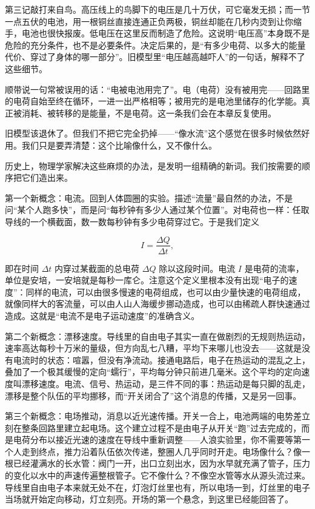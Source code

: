第三记敲打来自鸟。高压线上的鸟脚下的电压是几十万伏，可它毫发无损；而一节一点五伏的电池，用一根铜丝直接连通正负两极，铜丝却能在几秒内烫到让你缩手，电池也很快报废。低电压在这里反而制造了危险。这说明“电压高”本身既不是危险的充分条件，也不是必要条件。决定后果的，是“有多少电荷、以多大的能量代价、穿过了身体的哪一部分”。旧模型里“电压越高越吓人”的一句话，解释不了这些细节。

顺带说一句常被误用的话：“电被电池用完了”。电（电荷）没有被用完——回路里的电荷自始至终在循环，一进一出严格相等；被用完的是电池里储存的化学能。真正被消耗、被转移的是能量，不是电荷。这一条我们会在本章反复使用。

旧模型该退休了。但我们不把它完全扔掉——“像水流”这个感觉在很多时候依然好用。我们只是要弄清楚：这个比喻像什么，又不像什么。


历史上，物理学家解决这些麻烦的办法，是发明一组精确的新词。我们按需要的顺序把它们造出来。

第一个新概念：电流。回到人体圆圈的实验。描述“流量”最自然的办法，不是问“某个人跑多快”，而是问“每秒钟有多少人通过某个位置”。对电荷也一样：任取导线的一个横截面，数一数每秒钟有多少电荷穿过它。于是我们定义

\[
I=\frac{\Delta Q}{\Delta t},
\]

即在时间 \(\Delta t\) 内穿过某截面的总电荷 \(\Delta Q\) 除以这段时间。电流 \(I\) 是电荷的流率，单位是安培，一安培就是每秒一库仑。注意这个定义里根本没有出现“电子的速度”：同样的电流，可以由很多慢速的电荷组成，也可以由少量快速的电荷组成，就像同样大的客流量，可以由人山人海缓步挪动造成，也可以由稀疏人群快速通过造成。这就是“电流不是电子运动速度”的准确含义。

第二个新概念：漂移速度。导线里的自由电子其实一直在做剧烈的无规则热运动，速率高达每秒十万米的量级，但方向乱七八糟，平均下来哪儿也没去——这就是没有电流时的状态：喧嚣，但没有净流动。接通电路后，电子在热运动的混乱之上，叠加了一个极其缓慢的定向“蠕行”，平均每分钟只前进几毫米。这个平均的定向速度叫漂移速度。电流、信号、热运动，是三件不同的事：热运动是每只脚的乱走，漂移是整个队伍的平均挪移，而“开关闭合了”这个消息的传播，又是另一回事。

第三个新概念：电场推动，消息以近光速传播。开关一合上，电池两端的电势差立刻在整条回路里建立起电场。这个建立过程不是由电子从开关“跑”过去完成的，而是电荷分布以接近光速的速度在导线中重新调整——人浪实验里，你不需要等第一个人走到终点，推力沿着队伍依次传递，整圈人几乎同时开走。电场像什么？像一根已经灌满水的长水管：阀门一开，出口立刻出水，因为水早就充满了管子，压力的变化以水中的声速传遍整根管子。它不像什么？不像空水管等水从源头流过来。导线里自由电子本来就无处不在，灯泡灯丝里也有，所以电场一到，灯丝里的电子当场就开始定向移动，灯立刻亮。开场的第一个悬念，到这里已经能回答了。

